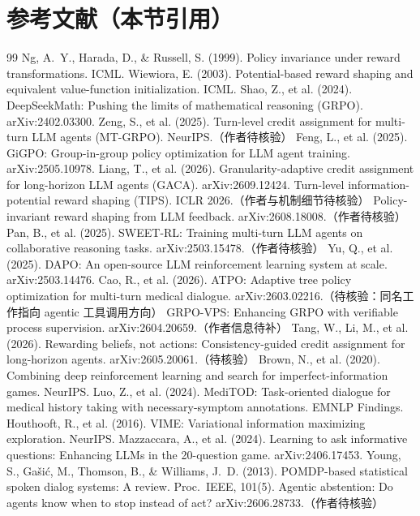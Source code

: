 \documentclass[11pt,a4paper]{ctexart}
\newcommand{\1}[1]{\mathbb{1}\!\left[#1\right]}
\begin{document}
\section*{参考文献（本节引用）}
\begin{thebibliography}{99}\small
{} Ng, A.~Y., Harada, D., \& Russell, S. (1999). Policy invariance under reward transformations. ICML.
 Wiewiora, E. (2003). Potential-based reward shaping and equivalent value-function initialization. ICML.
 Shao, Z., et al. (2024). DeepSeekMath: Pushing the limits of mathematical reasoning (GRPO). arXiv:2402.03300.
 Zeng, S., et al. (2025). Turn-level credit assignment for multi-turn LLM agents (MT-GRPO). NeurIPS.（作者待核验）
 Feng, L., et al. (2025). GiGPO: Group-in-group policy optimization for LLM agent training. arXiv:2505.10978.
 Liang, T., et al. (2026). Granularity-adaptive credit assignment for long-horizon LLM agents (GACA). arXiv:2609.12424.
 Turn-level information-potential reward shaping (TIPS). ICLR 2026.（作者与机制细节待核验）
 Policy-invariant reward shaping from LLM feedback. arXiv:2608.18008.（作者待核验）
 Pan, B., et al. (2025). SWEET-RL: Training multi-turn LLM agents on collaborative reasoning tasks. arXiv:2503.15478.（作者待核验）
 Yu, Q., et al. (2025). DAPO: An open-source LLM reinforcement learning system at scale. arXiv:2503.14476.
 Cao, R., et al. (2026). ATPO: Adaptive tree policy optimization for multi-turn medical dialogue. arXiv:2603.02216.（待核验：同名工作指向 agentic 工具调用方向）
 GRPO-VPS: Enhancing GRPO with verifiable process supervision. arXiv:2604.20659.（作者信息待补）
 Tang, W., Li, M., et al. (2026). Rewarding beliefs, not actions: Consistency-guided credit assignment for long-horizon agents. arXiv:2605.20061.（待核验）
 Brown, N., et al. (2020). Combining deep reinforcement learning and search for imperfect-information games. NeurIPS.
 Luo, Z., et al. (2024). MediTOD: Task-oriented dialogue for medical history taking with necessary-symptom annotations. EMNLP Findings.
 Houthooft, R., et al. (2016). VIME: Variational information maximizing exploration. NeurIPS.
 Mazzaccara, A., et al. (2024). Learning to ask informative questions: Enhancing LLMs in the 20-question game. arXiv:2406.17453.
 Young, S., Ga\v{s}i\'c, M., Thomson, B., \& Williams, J.~D. (2013). POMDP-based statistical spoken dialog systems: A review. Proc.\ IEEE, 101(5).
 Agentic abstention: Do agents know when to stop instead of act? arXiv:2606.28733.（作者待核验）
\end{thebibliography}
\end{document}
